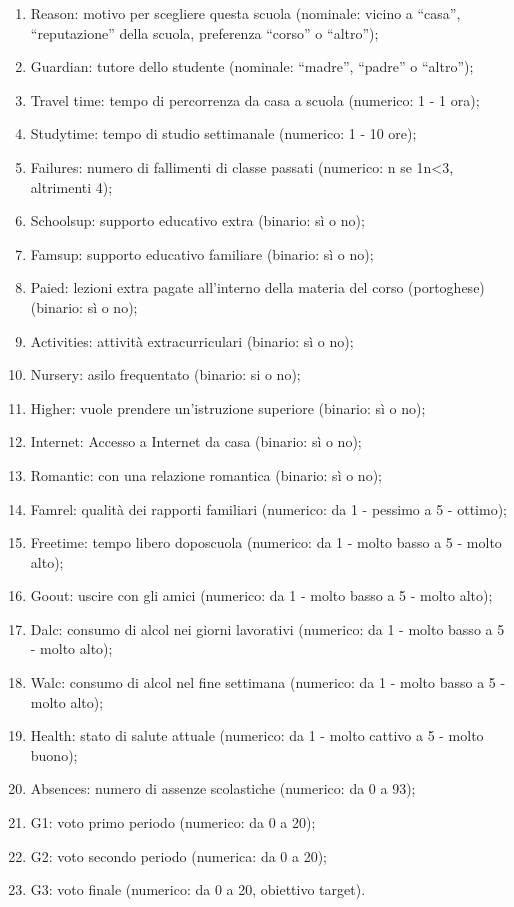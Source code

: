 \documentclass[12pt,a4paper]{report}
\begin{document}
\begin{multicols}{2}
\begin{enumerate}
		\item Reason: motivo per scegliere questa scuola (nominale: vicino a “casa”, “reputazione” della scuola, preferenza “corso” o “altro”);
		\item Guardian: tutore dello studente (nominale: “madre”, “padre” o “altro”);
		\item Travel time: tempo di percorrenza da casa a scuola (numerico: 1 - 1 ora);
		\item Studytime: tempo di studio settimanale (numerico: 1 - 10 ore);
		\item Failures: numero di fallimenti di classe passati (numerico: n se 1n<3, altrimenti 4);
		\item Schoolsup: supporto educativo extra (binario: sì o no);
		\item Famsup: supporto educativo familiare (binario: sì o no);
		\item Paied: lezioni extra pagate all'interno della materia del corso (portoghese) (binario: sì o no);
		\item Activities: attività extracurriculari (binario: sì o no);
		\item Nursery: asilo frequentato (binario: si o no);
		\item Higher: vuole prendere un'istruzione superiore (binario: sì o no);
		\item Internet: Accesso a Internet da casa (binario: sì o no);
		\item Romantic: con una relazione romantica (binario: sì o no);
		\item Famrel: qualità dei rapporti familiari (numerico: da 1 - pessimo a 5 - ottimo);
		\item Freetime: tempo libero doposcuola (numerico: da 1 - molto basso a 5 - molto alto);
		\item Goout: uscire con gli amici (numerico: da 1 - molto basso a 5 - molto alto);
		\item Dalc: consumo di alcol nei giorni lavorativi (numerico: da 1 - molto basso a 5 - molto alto);
		\item Walc: consumo di alcol nel fine settimana (numerico: da 1 - molto basso a 5 - molto alto);
		\item Health: stato di salute attuale (numerico: da 1 - molto cattivo a 5 - molto buono);
		\item Absences: numero di assenze scolastiche (numerico: da 0 a 93);
		\item G1: voto primo periodo (numerico: da 0 a 20);
		\item G2: voto secondo periodo (numerica: da 0 a 20);
		\item G3: voto finale (numerico: da 0 a 20, obiettivo target).
	\end{enumerate}


\end{multicols}
\end{document}

